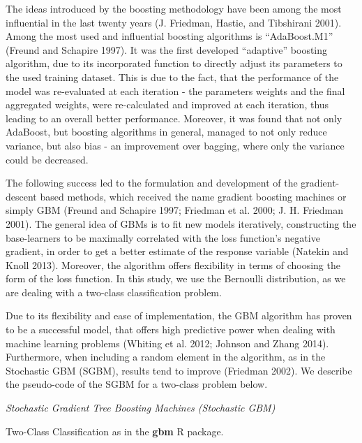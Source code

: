 \documentclass[12pt,]{article}
\begin{document}
The ideas introduced by the boosting methodology have been among the
most influential in the last twenty years (J. Friedman, Hastie, and
Tibshirani 2001). Among the most used and influential boosting
algorithms is ``AdaBoost.M1'' (Freund and Schapire 1997). It was the
first developed ``adaptive'' boosting algorithm, due to its incorporated
function to directly adjust its parameters to the used training dataset.
This is due to the fact, that the performance of the model was
re-evaluated at each iteration - the parameters weights and the final
aggregated weights, were re-calculated and improved at each iteration,
thus leading to an overall better performance. Moreover, it was found
that not only AdaBoost, but boosting algorithms in general, managed to
not only reduce variance, but also bias - an improvement over bagging,
where only the variance could be decreased.

The following success led to the formulation and development of the
gradient-descent based methods, which received the name gradient
boosting machines or simply GBM (Freund and Schapire 1997; Friedman et
al. 2000; J. H. Friedman 2001). The general idea of GBMs is to fit new
models iteratively, constructing the base-learners to be maximally
correlated with the loss function's negative gradient, in order to get a
better estimate of the response variable (Natekin and Knoll 2013).
Moreover, the algorithm offers flexibility in terms of choosing the form
of the loss function. In this study, we use the Bernoulli distribution,
as we are dealing with a two-class classification problem.

Due to its flexibility and ease of implementation, the GBM algorithm has
proven to be a successful model, that offers high predictive power when
dealing with machine learning problems (Whiting et al. 2012; Johnson and
Zhang 2014). Furthermore, when including a random element in the
algorithm, as in the Stochastic GBM (SGBM), results tend to improve
(Friedman 2002). We describe the pseudo-code of the SGBM for a two-class
problem below.

\emph{Stochastic Gradient Tree Boosting Machines (Stochastic GBM)}

Two-Class Classification as in the \textbf{gbm} R package.
\end{document}
